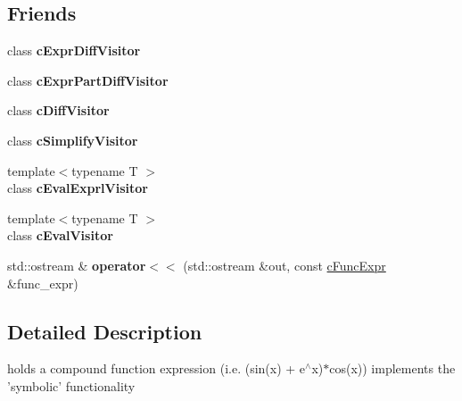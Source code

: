 \subsection*{Friends}
\begin{DoxyCompactItemize}
\item 
\hypertarget{classcFuncExpr_ae37b92d9226a688089d270228c442608}{class {\bfseries c\-Expr\-Diff\-Visitor}}\label{classcFuncExpr_ae37b92d9226a688089d270228c442608}

\item 
\hypertarget{classcFuncExpr_aa6ab9d0d611acf7a332d381f703796e6}{class {\bfseries c\-Expr\-Part\-Diff\-Visitor}}\label{classcFuncExpr_aa6ab9d0d611acf7a332d381f703796e6}

\item 
\hypertarget{classcFuncExpr_a9fc7bf9f80422eb5d9255b49005b24b6}{class {\bfseries c\-Diff\-Visitor}}\label{classcFuncExpr_a9fc7bf9f80422eb5d9255b49005b24b6}

\item 
\hypertarget{classcFuncExpr_a53892c389b88a764b4b9c5385980f348}{class {\bfseries c\-Simplify\-Visitor}}\label{classcFuncExpr_a53892c389b88a764b4b9c5385980f348}

\item 
\hypertarget{classcFuncExpr_a08e7e27ba55da95f22853e6bfa89484e}{{\footnotesize template$<$typename T $>$ }\\class {\bfseries c\-Eval\-Exprl\-Visitor}}\label{classcFuncExpr_a08e7e27ba55da95f22853e6bfa89484e}

\item 
\hypertarget{classcFuncExpr_af2a8569148682f5f2a6226e47ed2e3ec}{{\footnotesize template$<$typename T $>$ }\\class {\bfseries c\-Eval\-Visitor}}\label{classcFuncExpr_af2a8569148682f5f2a6226e47ed2e3ec}

\item 
\hypertarget{classcFuncExpr_aaa0d90351f14b880688cece98cc467c7}{std\-::ostream \& {\bfseries operator$<$$<$} (std\-::ostream \&out, const \hyperlink{classcFuncExpr}{c\-Func\-Expr} \&func\-\_\-expr)}\label{classcFuncExpr_aaa0d90351f14b880688cece98cc467c7}

\end{DoxyCompactItemize}


\subsection{Detailed Description}
holds a compound function expression (i.\-e. (sin(x) + e$^\wedge$x)$\ast$cos(x)) implements the 'symbolic' functionality 

